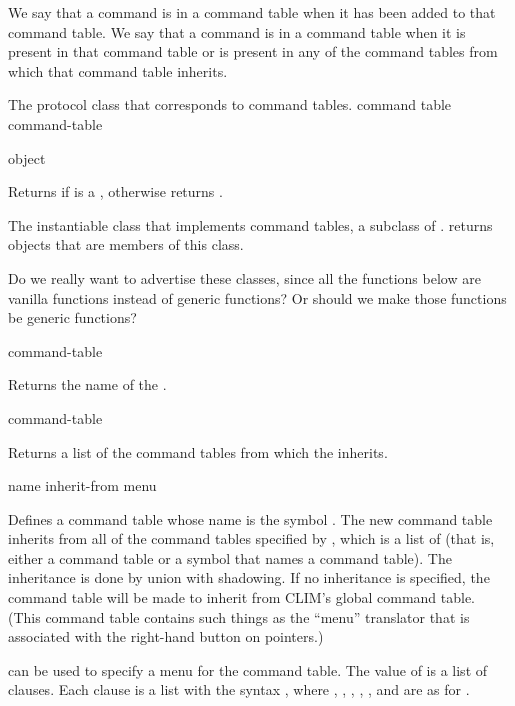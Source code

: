 We say that a command is  in a command table when it has been
added to that command table.  We say that a command is  in a
command table when it is present in that command table or is present in any of
the command tables from which that command table inherits.



The protocol class that corresponds to command tables.
 {command table} {command-table}
\Mutable

 {object}

Returns  if  is a , otherwise returns
.


The instantiable class that implements command tables, a subclass of
.   returns objects that are members of
this class.

 {Do we really want to advertise these classes, since all the
functions below are vanilla functions instead of generic functions?  Or should
we make those functions be generic functions?}


 {command-table}

Returns the name of the  .

 {command-table}

Returns a list of the command tables from which the 
 inherits.
\ReadOnly


 {name \key inherit-from menu}

Defines a command table whose name is the symbol .  The new command
table inherits from all of the command tables specified by ,
which is a list of  (that is, either a command
table or a symbol that names a command table).  The inheritance is done by union
with shadowing.  If no inheritance is specified, the command table will be made
to inherit from CLIM's global command table.  (This command table contains such
things as the ``menu'' translator that is associated with the right-hand button
on pointers.)

 can be used to specify a menu for the command table.  The value of
 is a list of clauses.  Each clause is a list with the syntax
, where , ,
, , , and  are as
for .

